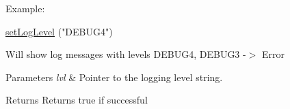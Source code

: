 Example\+:
\begin{DoxyCode}
\hyperlink{group__logging_gad113b4e32a079d7a8c1d188561e1ffbc}{setLogLevel} (\textcolor{stringliteral}{"DEBUG4"}) 
\end{DoxyCode}


Will show log messages with levels D\+E\+B\+U\+G4, D\+E\+B\+U\+G3 -\/$>$ Error


\begin{DoxyParams}{Parameters}
{\em lvl} & Pointer to the logging level string. \\
\hline
\end{DoxyParams}
\begin{DoxyReturn}{Returns}
Returns true if successful 
\end{DoxyReturn}

